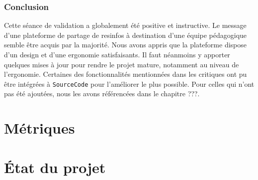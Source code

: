 \subsubsection*{Conclusion}

Cette séance de validation a globalement été positive et instructive. Le message d'une plateforme de partage de \glspl{resinfo} à destination d'une équipe pédagogique semble être acquis par la majorité. 
Nous avons appris que la plateforme dispose d'un design et d'une ergonomie satisfaisants. Il faut néanmoins y apporter quelques mises à jour pour rendre le projet mature, notamment au niveau de l'ergonomie.
Certaines des fonctionnalités mentionnées dans les critiques ont pu être intégrées à \texttt{SourceCode} pour l'améliorer le plus possible. Pour celles qui n'ont pas été ajoutées, nous les avons référencées dans le chapitre ???.

\section{Métriques}
\section{État du projet}
